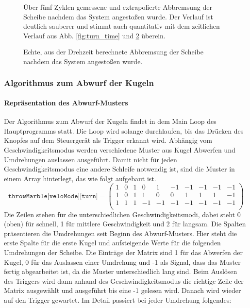 \documentclass{kis}
\begin{document}
\begin{figure}
	
	\caption[Über fünf Zyklen gemessene und extrapolierte Abbremsung der Scheibe.]{Über fünf Zyklen gemessene und extrapolierte Abbremsung der Scheibe nachdem das System angestoßen wurde. Der Verlauf ist deutlich sauberer und stimmt auch quantitativ mit dem zeitlichen Verlauf aus Abb. \ref{fig:turn_time} und \ref{fig:deceleration_true} überein.}
	\label{fig:deceleration_five}
\end{figure}

\begin{figure}
	
	\caption{Echte, aus der Drehzeit berechnete Abbremsung der Scheibe nachdem das System angestoßen wurde.}
	\label{fig:deceleration_true}
\end{figure}
\clearpage

\subsubsection{Algorithmus zum Abwurf der Kugeln}
\paragraph{Repräsentation des Abwurf-Musters}
Der Algorithmus zum Abwurf der Kugeln findet in dem Main Loop des Hauptprogramms statt. Die Loop wird solange durchlaufen, bis das Drücken des Knopfes auf dem Steuergerät als Trigger erkannt wird. Abhängig vom Geschwindigkeitsmodus werden verschiedene Muster aus Kugel Abwerfen und Umdrehungen auslassen ausgeführt. Damit nicht für jeden Geschwindigkeitsmodus eine andere Schleife notwendig ist, sind die Muster in einem Array hinterlegt, das wie folgt aufgebaut ist. 
$$\texttt{throwMarble[veloMode][turn]} = 
\left( \begin{array}{rrrrrrrrrr} 
 1 &  0 &  1 &  0 &  1 & -1 & -1 & -1 & -1 & -1 \\
 1 &  0 &  1 &  1 &  0 &  0 &  1 &  1 &  1 & -1 \\
 1 &  1 &  1 & -1 & -1 & -1 & -1 & -1 & -1 & -1 \\ 
\end{array} \right)$$
Die Zeilen stehen für die unterschiedlichen Geschwindigkeitsmodi, dabei steht 0 (oben) für schnell, 1 für mittlere Geschwindigkeit und 2 für langsam. Die Spalten präsentieren die Umdrehungen seit Beginn des Abwurf-Musters. Hier steht die erste Spalte für die erste Kugel und aufsteigende Werte für die folgenden Umdrehungen der Scheibe. Die Einträge der Matrix sind 1 für das Abwerfen der Kugel, 0 für das Auslassen einer Umdrehung und -1 als Signal, dass das Muster fertig abgearbeitet ist, da die Muster unterschiedlich lang sind.
Beim Auslösen des Triggers wird dann anhand des Geschwindigkeitsmodus die richtige Zeile der Matrix ausgewählt und ausgeführt bis eine -1 gelesen wird. Danach wird wieder auf den Trigger gewartet. Im Detail passiert bei jeder Umdrehung folgendes:
\end{document}
